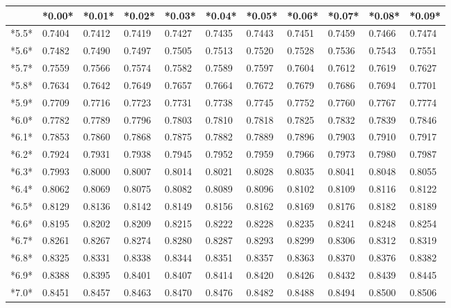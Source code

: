 \documentclass[margin=0.5in]{article}
\begin{document}
\begin{center}
\begin{tabular}{|l|l|l|l|l|l|l|l|l|l|l|}
\hline
 & *0.00* & *0.01* & *0.02* & *0.03* & *0.04* & *0.05* & *0.06* & *0.07* & *0.08* & *0.09* \\
\hline
*5.5* & 0.7404 & 0.7412 & 0.7419 & 0.7427 & 0.7435 & 0.7443 & 0.7451 & 0.7459 & 0.7466 & 0.7474 \\
\hline
*5.6* & 0.7482 & 0.7490 & 0.7497 & 0.7505 & 0.7513 & 0.7520 & 0.7528 & 0.7536 & 0.7543 & 0.7551 \\
\hline
*5.7* & 0.7559 & 0.7566 & 0.7574 & 0.7582 & 0.7589 & 0.7597 & 0.7604 & 0.7612 & 0.7619 & 0.7627 \\
\hline
*5.8* & 0.7634 & 0.7642 & 0.7649 & 0.7657 & 0.7664 & 0.7672 & 0.7679 & 0.7686 & 0.7694 & 0.7701 \\
\hline
*5.9* & 0.7709 & 0.7716 & 0.7723 & 0.7731 & 0.7738 & 0.7745 & 0.7752 & 0.7760 & 0.7767 & 0.7774 \\
\hline
*6.0* & 0.7782 & 0.7789 & 0.7796 & 0.7803 & 0.7810 & 0.7818 & 0.7825 & 0.7832 & 0.7839 & 0.7846 \\
\hline
*6.1* & 0.7853 & 0.7860 & 0.7868 & 0.7875 & 0.7882 & 0.7889 & 0.7896 & 0.7903 & 0.7910 & 0.7917 \\
\hline
*6.2* & 0.7924 & 0.7931 & 0.7938 & 0.7945 & 0.7952 & 0.7959 & 0.7966 & 0.7973 & 0.7980 & 0.7987 \\
\hline
*6.3* & 0.7993 & 0.8000 & 0.8007 & 0.8014 & 0.8021 & 0.8028 & 0.8035 & 0.8041 & 0.8048 & 0.8055 \\
\hline
*6.4* & 0.8062 & 0.8069 & 0.8075 & 0.8082 & 0.8089 & 0.8096 & 0.8102 & 0.8109 & 0.8116 & 0.8122 \\
\hline
*6.5* & 0.8129 & 0.8136 & 0.8142 & 0.8149 & 0.8156 & 0.8162 & 0.8169 & 0.8176 & 0.8182 & 0.8189 \\
\hline
*6.6* & 0.8195 & 0.8202 & 0.8209 & 0.8215 & 0.8222 & 0.8228 & 0.8235 & 0.8241 & 0.8248 & 0.8254 \\
\hline
*6.7* & 0.8261 & 0.8267 & 0.8274 & 0.8280 & 0.8287 & 0.8293 & 0.8299 & 0.8306 & 0.8312 & 0.8319 \\
\hline
*6.8* & 0.8325 & 0.8331 & 0.8338 & 0.8344 & 0.8351 & 0.8357 & 0.8363 & 0.8370 & 0.8376 & 0.8382 \\
\hline
*6.9* & 0.8388 & 0.8395 & 0.8401 & 0.8407 & 0.8414 & 0.8420 & 0.8426 & 0.8432 & 0.8439 & 0.8445 \\
\hline
*7.0* & 0.8451 & 0.8457 & 0.8463 & 0.8470 & 0.8476 & 0.8482 & 0.8488 & 0.8494 & 0.8500 & 0.8506 \\

\end{tabular}
\end{center}
\end{document}
